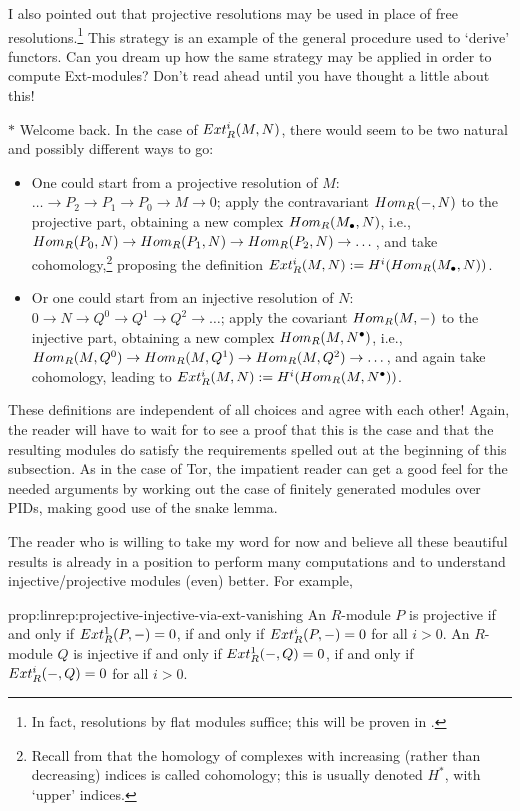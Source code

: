 I also pointed out that projective resolutions may be used in place of
free resolutions.\footnote{In fact, resolutions by flat modules
  suffice; this will be proven in .} This strategy is
an example of the general procedure used to `derive' functors. Can you
dream up how the same strategy may be applied in order to compute
Ext-modules? Don't read ahead until you have thought a little about
this!

$*$ Welcome back. In the case of $Ext^i_R(M,N)$, there would seem to
be two natural and possibly different ways to go:
\begin{itemize}
\item One could start from a projective resolution of $M$:
  $\dots \to P_2 \to P_1 \to P_0 \to M \to 0$; apply the contravariant
  $Hom_R(-, N)$ to the projective part, obtaining a new complex
  $Hom_R(M_\bullet, N)$, i.e.,
  $Hom_R(P_0,N) \to Hom_R(P_1,N) \to Hom_R(P_2,N) \to \dots$, and
  take cohomology,\footnote{Recall from
     that the
    homology of complexes with increasing (rather than decreasing)
    indices is called cohomology; this is usually denoted $H^*$, with
    `upper' indices.} proposing the definition
  $Ext^i_R(M,N) := H^i(Hom_R(M_\bullet, N))$.
\item Or one could start from an injective resolution of $N$:
  $0 \to N \to Q^0 \to Q^1 \to Q^2 \to \dots$; apply the covariant
  $Hom_R(M, -)$ to the injective part, obtaining a new complex
  $Hom_R(M, N^\bullet)$, i.e.,
  $Hom_R(M,Q^0) \to Hom_R(M,Q^1) \to Hom_R(M,Q^2) \to \dots$, and
  again take cohomology, leading to
  $Ext^i_R(M,N) := H^i(Hom_R(M, N^\bullet))$.
\end{itemize}
These definitions are independent of all choices and agree with each
other! Again, the reader will have to wait for  to
see a proof that this is the case and that the resulting modules do
satisfy the requirements spelled out at the beginning of this
subsection. As in the case of Tor, the impatient reader can get a good
feel for the needed arguments by working out the case of finitely
generated modules over PIDs, making good use of the snake lemma.

The reader who is willing to take my word for now and believe all
these beautiful results is already in a position to perform many
computations and to understand injective/projective modules (even)
better. For example,

\begin{prop}{}{prop:linrep:projective-injective-via-ext-vanishing}
  An $R$-module $P$ is projective if and only if $Ext^1_R(P, -) = 0$,
  if and only if $Ext^i_R(P, -) = 0$ for all $i > 0$. An $R$-module
  $Q$ is injective if and only if $Ext^1_R(-, Q) = 0$, if and only if
  $Ext^i_R(-, Q) = 0$ for all $i > 0$.
\end{prop}

